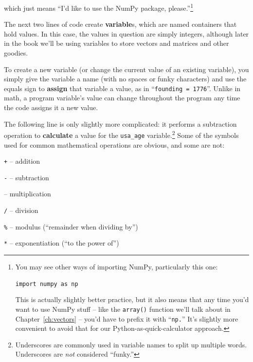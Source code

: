 which just means ``I'd like to use the NumPy package, please.''\footnote{You
may see other ways of importing NumPy, particularly this one:

\medskip
\quad\quad\texttt{import numpy as np}
\medskip

This is actually slightly better practice, but it also means that any time
you'd want to use NumPy stuff -- like the \texttt{array()} function we'll talk
about in Chapter~\ref{ch:vectors} -- you'd have to prefix it with
``\texttt{np.}'' It's slightly more convenient to avoid that for our
Python-as-quick-calculator approach.}

\smallskip


The next two lines of code create \textbf{variable}s, which are named
containers that hold values. In this case, the values in question are simply
integers, although later in the book we'll be using variables to store vectors
and matrices and other goodies.

To create a new variable (or change the current value of an existing variable),
you simply give the variable a name (with no spaces or funky characters) and
use the equals sign to \textbf{assign} that variable a value, as in
``\texttt{founding = 1776}''. Unlike in math, a program variable's value can
change throughout the program any time the code assigns it a new value.

The following line is only slightly more complicated: it performs a subtraction
operation to \textbf{calculate} a value for the \texttt{usa\_age}
variable.\footnote{Underscores are commonly used in variable names to split up
multiple words. Underscores are \textit{not} considered ``funky.''} Some of the
symbols used for common mathematical operations are obvious, and some are not:

\begin{compactitem}
\item[\texttt{\large +}]-- addition
\item[\texttt{\large -}]-- subtraction
\item[\texttt{\large *}]-- multiplication
\item[\texttt{\large /}]-- division
\item[\texttt{\large \%}]-- modulus (``remainder when dividing by'')
\item[\texttt{\large **}]-- exponentiation (``to the power of'')
\end{compactitem}

